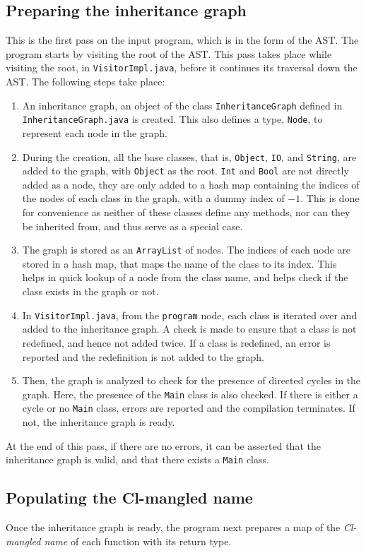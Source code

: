 \documentclass{article}
\begin{document}
\subsection*{Preparing the inheritance graph}
This is the first pass on the input program, which is in the form of the AST. The program starts by visiting the root of the AST. This pass takes place while visiting the root, in \verb|VisitorImpl.java|, before it continues its traversal down the AST. The following steps take place:
\begin{enumerate}
	\item An inheritance graph, an object of the class \verb|InheritanceGraph| defined in \verb|InheritanceGraph.java| is created. This also defines a type, \verb|Node|, to represent each node in the graph.
	\item During the creation, all the base classes, that is, \verb|Object|, \verb|IO|, and \verb|String|, are added to the graph, with \verb|Object| as the root. \verb|Int| and \verb|Bool| are not directly added as a node, they are only added to a hash map containing the indices of the nodes of each class in the graph, with a dummy index of $-1$. This is done for convenience as neither of these classes define any methods, nor can they be inherited from, and thus serve as a special case.
	\item The graph is stored as an \verb|ArrayList| of nodes. The indices of each node are stored in a hash map, that maps the name of the class to its index. This helps in quick lookup of a node from the class name, and helps check if the class exists in the graph or not.
	\item In \verb|VisitorImpl.java|, from the \verb|program| node, each class is iterated over and added to the inheritance graph. A check is made to ensure that a class is not redefined, and hence not added twice. If a class is redefined, an error is reported and the redefinition is not added to the graph.
	\item Then, the graph is analyzed to check for the presence of directed cycles in the graph. Here, the presence of the \verb|Main| class is also checked. If there is either a cycle or no \verb|Main| class, errors are reported and the compilation terminates. If not, the inheritance graph is ready.
\end{enumerate}
At the end of this pass, if there are no errors, it can be asserted that the inheritance graph is valid, and that there exists a \verb|Main| class. 

\subsection*{Populating the Cl-mangled name}
Once the inheritance graph is ready, the program next prepares a map of the \textit{Cl-mangled name} of each function with its return type.
\end{document}
